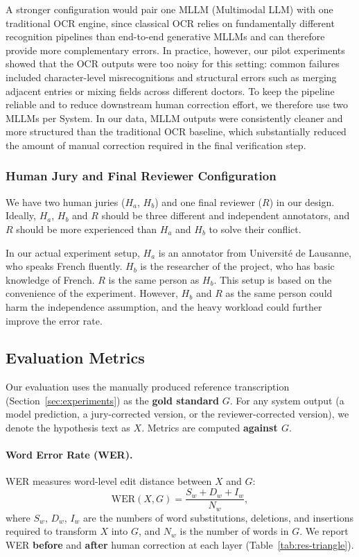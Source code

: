 A stronger configuration would pair one MLLM (Multimodal LLM) with one traditional OCR engine, since classical OCR relies on fundamentally different recognition pipelines than end-to-end generative MLLMs and can therefore provide more complementary errors. In practice, however, our pilot experiments showed that the OCR outputs were too noisy for this setting: common failures included character-level misrecognitions and structural errors such as merging adjacent entries or mixing fields across different doctors. To keep the pipeline reliable and to reduce downstream human correction effort, we therefore use two MLLMs per System. In our data, MLLM outputs were consistently cleaner and more structured than the traditional OCR baseline, which substantially reduced the amount of manual correction required in the final verification step.

\subsubsection{Human Jury and Final Reviewer Configuration}
\label{sec:jury}
We have two human juries ($H_a$, $H_b$) and one final reviewer ($R$) in our design. Ideally, $H_a$, $H_b$ and $R$ should be three different and independent annotators, and $R$ should be more experienced than $H_a$ and $H_b$ to solve their conflict.

In our actual experiment setup, $H_a$ is an annotator from Université de Lausanne, who speaks French fluently. $H_b$ is the researcher of the project, who has basic knowledge of French. $R$ is the same person as $H_b$. This setup is based on the convenience of the experiment. However, $H_b$ and $R$ as the same person could harm the independence assumption, and the heavy workload could further improve the error rate.


\subsection{Evaluation Metrics}
\label{subsec:eval-metrics}

Our evaluation uses the manually produced reference transcription (Section~\ref{sec:experiments}) as the \textbf{gold standard} $G$. For any system output (a model prediction, a jury-corrected version, or the reviewer-corrected version), we denote the hypothesis text as $X$. Metrics are computed \textbf{against $G$}.

\paragraph{Word Error Rate (WER).}
WER measures word-level edit distance between $X$ and $G$:
\begin{equation}
    \mathrm{WER}(X, G) = \frac{S_w + D_w + I_w}{N_w},
\end{equation}
where $S_w$, $D_w$, $I_w$ are the numbers of word substitutions, deletions, and insertions required to transform $X$ into $G$, and $N_w$ is the number of words in $G$. We report WER \textbf{before} and \textbf{after} human correction at each layer (Table~\ref{tab:res-triangle}).

